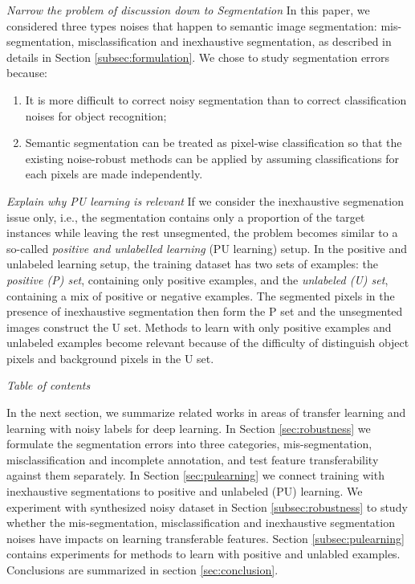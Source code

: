 \noindent \textit{Narrow the problem of discussion down to Segmentation}
\noindent
In this paper, we considered three types noises that happen to semantic image segmentation: mis-segmentation, misclassification and inexhaustive segmentation, as described in details in Section \ref{subsec:formulation}.
We chose to study segmentation errors because:
\begin{enumerate}
  \item It is more difficult to correct noisy segmentation than to correct classification noises for object recognition;
  \item Semantic segmentation can be treated as pixel-wise classification so that the existing noise-robust methods can be applied by assuming classifications for each pixels are made independently.
\end{enumerate}


\noindent \textit{Explain why PU learning is relevant}
\noindent
If we consider the inexhaustive segmenation issue only, i.e., the segmentation contains only a proportion of the target instances while leaving the rest unsegmented, the problem becomes similar to a so-called \textit{positive and unlabelled learning} (PU learning) setup\cite{li2005learning}.
In the positive and unlabeled learning setup, the training dataset has two sets of examples: the \textit{positive (P) set}, containing only positive examples, and the \textit{unlabeled (U) set}, containing a mix of positive or negative examples.
The segmented pixels in the presence of inexhaustive segmentation then form the P set and the unsegmented images construct the U set.
Methods to learn with only positive examples and unlabeled examples become relevant because of the difficulty of distinguish object pixels and background pixels in the U set.


\noindent \textit{Table of contents}

\noindent
In the next section, we summarize related works in areas of transfer learning and learning with noisy labels for deep learning.
In Section \ref{sec:robustness} we formulate the segmentation errors into three categories, mis-segmentation, misclassification and incomplete annotation, and test feature transferability against them separately.
In Section \ref{sec:pulearning} we connect training with inexhaustive segmentations to positive and unlabeled (PU) learning.
We experiment with synthesized noisy dataset in Section \ref{subsec:robustness} to study whether the mis-segmentation, misclassification and inexhaustive segmentation noises have impacts on learning transferable features.
Section \ref{subsec:pulearning} contains experiments for methods to learn with positive and unlabled examples.
Conclusions are summarized in section \ref{sec:conclusion}.

